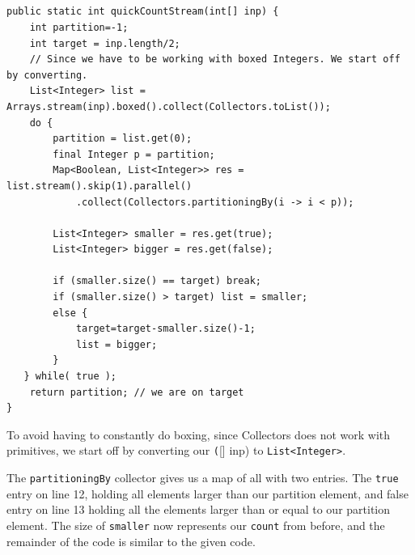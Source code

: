 \documentclass[a5paper]{article}
\begin{document}
\subsection{}

\begin{lstlisting}
public static int quickCountStream(int[] inp) {
    int partition=-1;
    int target = inp.length/2;
    // Since we have to be working with boxed Integers. We start off by converting.
    List<Integer> list = Arrays.stream(inp).boxed().collect(Collectors.toList());
    do {
        partition = list.get(0);
        final Integer p = partition;
        Map<Boolean, List<Integer>> res = list.stream().skip(1).parallel()
            .collect(Collectors.partitioningBy(i -> i < p));

        List<Integer> smaller = res.get(true);
        List<Integer> bigger = res.get(false);

        if (smaller.size() == target) break;
        if (smaller.size() > target) list = smaller;
        else {
            target=target-smaller.size()-1;
            list = bigger;
        }
   } while( true );
    return partition; // we are on target
}
\end{lstlisting}
To avoid having to constantly do boxing, since Collectors does not work with primitives,
we start off by converting our \texttt([] inp) to \texttt{List<Integer>}.

The \texttt{partitioningBy} collector gives us a map of all with two entries.
The \texttt{true} entry on line 12, holding all elements larger than our partition element, and false entry on line 13 holding
all the elements larger than or equal to our partition element. The size of \texttt{smaller} now represents our \texttt{count}
from before, and the remainder of the code is similar to the given code.
\end{document}
